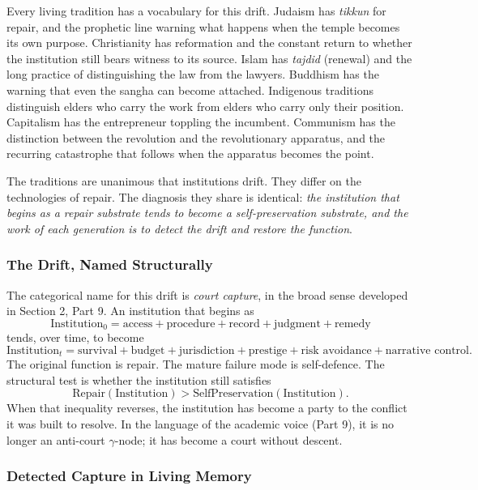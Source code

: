 \documentclass[
]{article}
\begin{document}
Every living tradition has a vocabulary for this drift. Judaism has
\emph{tikkun} for repair, and the prophetic line warning what
happens when the temple becomes its own purpose. Christianity has
reformation and the constant return to whether the institution
still bears witness to its source. Islam has \emph{tajdid}
(renewal) and the long practice of distinguishing the law from the
lawyers. Buddhism has the warning that even the sangha can become
attached. Indigenous traditions distinguish elders who carry the
work from elders who carry only their position. Capitalism has the
entrepreneur toppling the incumbent. Communism has the distinction
between the revolution and the revolutionary apparatus, and the
recurring catastrophe that follows when the apparatus becomes the
point.

The traditions are unanimous that institutions drift. They differ
on the technologies of repair. The diagnosis they share is
identical: \emph{the institution that begins as a repair substrate
tends to become a self-preservation substrate, and the work of each
generation is to detect the drift and restore the function}.

\subsubsection{The Drift, Named
Structurally}\label{the-drift-named-structurally}

The categorical name for this drift is \emph{court capture}, in the
broad sense developed in Section 2, Part 9. An institution that
begins as
\[
  \text{Institution}_0 = \text{access} + \text{procedure} +
  \text{record} + \text{judgment} + \text{remedy}
\]
tends, over time, to become
\[
  \text{Institution}_t = \text{survival} + \text{budget} +
  \text{jurisdiction} + \text{prestige} + \text{risk avoidance} +
  \text{narrative control}.
\]
The original function is repair. The mature failure mode is
self-defence. The structural test is whether the institution still
satisfies
\[
  \text{Repair}(\text{Institution}) > \text{SelfPreservation}
  (\text{Institution}).
\]
When that inequality reverses, the institution has become a party
to the conflict it was built to resolve. In the language of the
academic voice (Part 9), it is no longer an anti-court \(\gamma\)-node; it
has become a court without descent.

\subsubsection{Detected Capture in Living
Memory}\label{detected-capture-in-living-memory}
\end{document}
